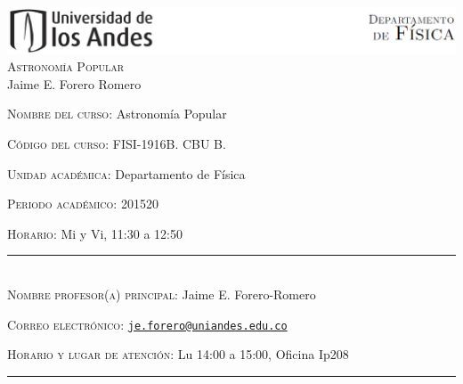 \documentclass[letterpaper,10pt,onecolumn]{article}
\begin{document}
\begin{center}

\includegraphics[width=490pt]{header.png}\\[0.5cm]

\textsc{\LARGE Astronom\'ia Popular}\\[0.1cm]

\large Jaime E. Forero Romero\\[0.5cm]

\end{center}

\large \noindent\textsc{Nombre del curso:} Astronom\'ia Popular %
 
\noindent\textsc{C\'odigo del curso:} FISI-1916B. CBU B.


\noindent\textsc{Unidad acad\'emica:} Departamento de F\'isica 

\noindent\textsc{Periodo acad\'emico:} 201520 %

\noindent\textsc{Horario:} Mi y Vi, 11:30 a 12:50 %

\noindent\rule{\textwidth}{1pt}\\[-0.3cm]

\normalsize \noindent\textsc{Nombre profesor(a) principal:} Jaime
E. Forero-Romero %

\noindent\textsc{Correo electr\'onico:}
\href{mailto:je.forero@uniandes.edu.co}{\nolinkurl{je.forero@uniandes.edu.co}}

\noindent\textsc{Horario y lugar de atenci\'on:} Lu 14:00 a 15:00, Oficina Ip208 %
\\[-0.1cm]


\noindent\rule{\textwidth}{1pt}\\[-0.1cm]

\addtocounter{mysection}{1}
\end{document}
